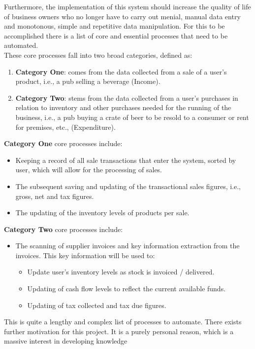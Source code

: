 Furthermore, the implementation of this system should increase the quality of life of business owners who no longer have to carry out menial, manual data entry and monotonous, simple and
repetitive data manipulation.
\bigbreak
For this to be accomplished there is a list of
core and essential processes that need to be automated. \\
These core processes fall into two broad categories, defined as:
\begin{enumerate}
	\item \textbf{Category One}: comes from the data collected from a sale of a user's product, i.e., a pub selling a beverage (Income).
	\item \textbf{Category Two}: stems from the data collected from a user's purchases in relation to inventory and other purchases needed for the running of the
	      business, i.e., a pub buying a crate of beer to be resold to a consumer or rent for premises, etc., (Expenditure).
\end{enumerate}
\textbf{Category One} core processes include:
\begin{itemize}
	\item Keeping a record of all sale transactions that enter the system, sorted by user, which will allow for the processing of sales.
	\item The subsequent saving and updating of the transactional sales figures, i.e., gross, net and tax figures.
	\item The updating of the inventory levels of products per sale.
\end{itemize}
\textbf{Category Two} core processes include:
\begin{itemize}
	\item The scanning of supplier invoices and key information extraction from the invoices. This key information will be used to:
	      \begin{itemize}
		      \item Update user's inventory levels as stock is invoiced / delivered.
		      \item Updating of cash flow levels to reflect the current available funds.
		      \item Updating of tax collected and tax due figures.
	      \end{itemize}
\end{itemize}
This is quite a lengthy and complex list of processes to automate.
\bigbreak
There exists further motivation for this project. It is a purely personal reason, which is a massive interest in developing knowledge
